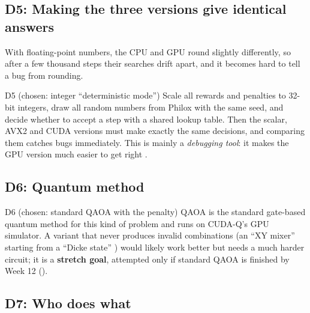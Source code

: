 \subsection{D5: Making the three versions give identical answers}

With floating-point numbers, the CPU and GPU round slightly differently, so after a few thousand steps their searches drift apart, and it becomes hard to tell a bug from rounding.

\begin{decision}{D5 (chosen: integer ``deterministic mode'')}
Scale all rewards and penalties to 32-bit integers, draw all random numbers from Philox with the same seed, and decide whether to accept a step with a shared lookup table. Then the scalar, AVX2 and CUDA versions must make exactly the same decisions, and comparing them catches bugs immediately. This is mainly a \emph{debugging tool}: it makes the GPU version much easier to get right \proposed.
\end{decision}

\subsection{D6: Quantum method}

\begin{decision}{D6 (chosen: standard QAOA with the penalty)}
QAOA is the standard gate-based quantum method for this kind of problem and runs on CUDA-Q's GPU simulator. A variant that never produces invalid combinations (an ``XY mixer'' starting from a ``Dicke state'' \cite{hadfield2019qaoa,wang2020xy,bartschi2019dicke}) would likely work better but needs a much harder circuit; it is a \textbf{stretch goal}, attempted only if standard QAOA is finished by Week 12 ().
\end{decision}

\subsection{D7: Who does what}

